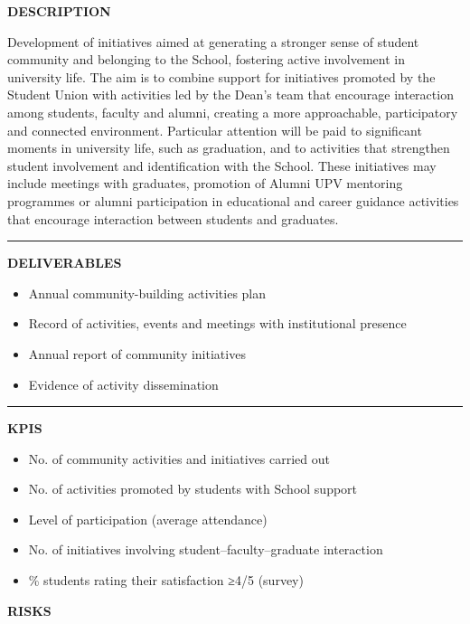 \documentclass[11pt,a4paper]{scrreprt}
\newcommand{\fieldlabel}[1]{%
  {\footnotesize\sffamily\bfseries\color{mutedcolor}\MakeUppercase{#1}}\par\nopagebreak[4]
}
\newcommand{\fieldsep}{\vspace{3pt}\noindent\textcolor{bordercolor}{\rule{\linewidth}{0.4pt}}\vspace{3pt}\par}
\begin{document}
\begin{tcolorbox}[pabox={e360color}{A.P.3.1 \enspace\textbullet\enspace Building Community and Sense of Belonging at the School}]

\fieldlabel{Description}
{\small Development of initiatives aimed at generating a stronger sense of student community and belonging to the School, fostering active involvement in university life. The aim is to combine support for initiatives promoted by the Student Union with activities led by the Dean's team that encourage interaction among students, faculty and alumni, creating a more approachable, participatory and connected environment. Particular attention will be paid to significant moments in university life, such as graduation, and to activities that strengthen student involvement and identification with the School. These initiatives may include meetings with graduates, promotion of Alumni UPV mentoring programmes or alumni participation in educational and career guidance activities that encourage interaction between students and graduates. }\par
\fieldsep
\fieldlabel{Deliverables}
{\small \begin{itemize}[noitemsep,topsep=2pt]
\item Annual community-building activities plan
\item Record of activities, events and meetings with institutional presence
\item Annual report of community initiatives
\item Evidence of activity dissemination
\end{itemize}}\par
\fieldsep
\fieldlabel{KPIs}
{\small \begin{itemize}[noitemsep,topsep=2pt]
\item No. of community activities and initiatives carried out
\item No. of activities promoted by students with School support
\item Level of participation (average attendance)
\item No. of initiatives involving student--faculty--graduate interaction
\item \% students rating their satisfaction ≥4/5 (survey)
\end{itemize}}\par
\end{tcolorbox}
\begin{tcolorbox}[riskbox]
{\footnotesize\sffamily\bfseries\color{red!50!black} RISKS}\par{}
\end{tcolorbox}
\end{document}
